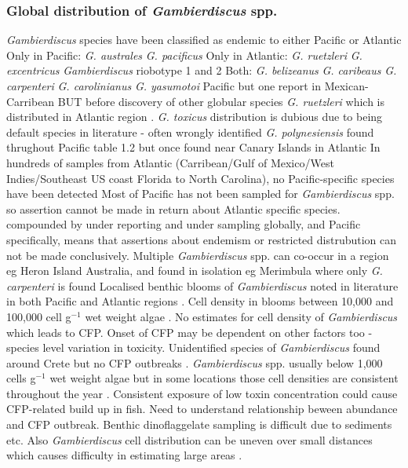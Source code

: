 \documentclass[12pt]{article}
\begin{document}
\subsubsection{Global distribution of \emph{Gambierdiscus} spp.}
\emph{Gambierdiscus} species have been classified as endemic to either Pacific or Atlantic \cite{berdalet2012global,litaker2010global}
Only in Pacific: \emph{G. australes} \emph{G. pacificus} %
Only in Atlantic: \emph{G. ruetzleri} \emph{G. excentricus} \emph{Gambierdiscus} riobotype 1 and 2 %
Both: \emph{G. belizeanus} \emph{G. caribeaus} \emph{G. carpenteri} \emph{G. carolinianus} \cite{litaker2010global,litaker2009taxonomy,berdalet2012global}
\emph{G. yasumotoi} Pacific but one report in Mexican-Carribean \cite{hernandez2004species} BUT before discovery of other globular species \emph{G. ruetzleri} which is distributed in Atlantic region \cite{litaker2009taxonomy}.
\emph{G. toxicus} distribution is dubious due to being default species in literature - often wrongly identified 
\emph{G. polynesiensis} found thrughout Pacific table 1.2 but once found near Canary Islands in Atlantic \cite{fraga2011gambierdiscus}
In hundreds of samples from Atlantic (Carribean/Gulf of Mexico/West Indies/Southeast US coast Florida to North Carolina), no Pacific-specific species have been detected \cite{berdalet2012global,litaker2010global}
Most of Pacific has not been sampled for \emph{Gambierdiscus} spp. so assertion cannot be made in return about Atlantic specific species.
compounded by under reporting and under sampling globally, and Pacific specifically, means that assertions about endemism or restricted distrubution can not be made conclusively.
Multiple \emph{Gambierdiscus} spp. can co-occur in a region eg Heron Island Australia, and found in isolation eg Merimbula where only \emph{G. carpenteri} is found %
Localised benthic blooms of \emph{Gambierdiscus} noted in literature in both Pacific and Atlantic regions \cite{nakajima1981toxicity,withers1984ciguatera,chinain1999seasonal,darius2007ciguatera}.
Cell density in blooms between 10,000 and 100,000 cell g$^{-1}$ wet weight algae \cite{litaker2010global}. No estimates for cell density of \emph{Gambierdiscus} which leads to CFP. Onset of CFP may be dependent on other factors too - species level variation in toxicity. Unidentified species of \emph{Gambierdiscus} found around Crete but no CFP outbreaks \cite{caillaud2010update}.
\emph{Gambierdiscus} spp. usually below 1,000 cells g$^{-1}$ wet weight algae \cite{litaker2010global} but in some locations those cell densities are consistent throughout the year \cite{chinain1999seasonal}.
Consistent exposure of low toxin concentration could cause CFP-related build up in fish. Need to understand relationship beween abundance and CFP outbreak. Benthic dinoflaggelate sampling is difficult due to sediments etc. Also \emph{Gambierdiscus} cell distribution can be uneven over small distances which causes difficulty in estimating large areas \cite{lobel1988assessment,ballantine1988population,litaker2010global}.
\end{document}
